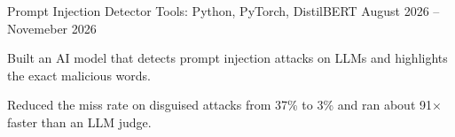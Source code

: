 \resumeProject
    {Prompt Injection Detector}
    {Tools: Python, PyTorch, DistilBERT}
    {August 2026 -- Novemeber 2026}
    {{} }
    \resumeItemListStart
      \item Built an AI model that detects prompt injection attacks on LLMs and highlights the exact malicious words.
      \item Reduced the miss rate on disguised attacks from 37\% to 3\% and ran about 91$\times$ faster than an LLM judge.
    \resumeItemListEnd
